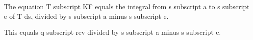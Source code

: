 The equation T subscript KF equals the integral from s subscript a to s subscript e of T ds, divided by s subscript a minus s subscript e.

This equals q subscript rev divided by s subscript a minus s subscript e.